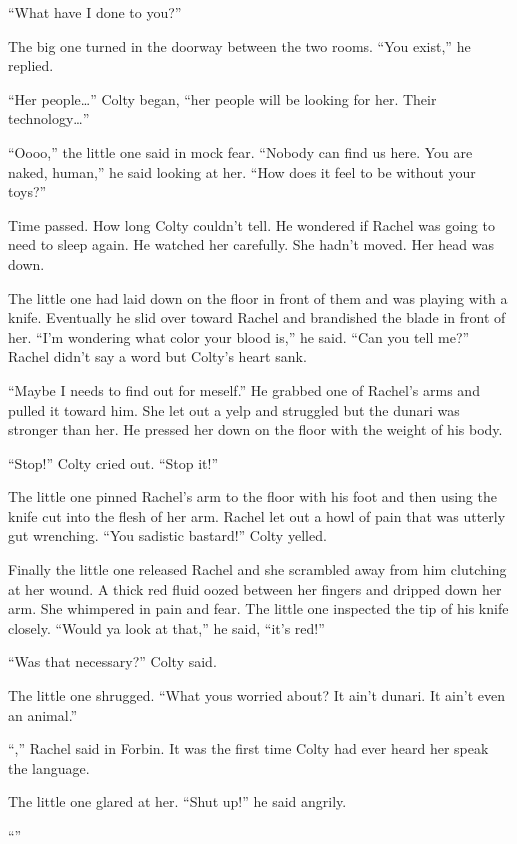 ``What have I done to you?''

The big one turned in the doorway between the two rooms. ``You exist,'' he replied.

``Her people\ldots'' Colty began, ``her people will be looking for her. Their technology\ldots''

``Oooo,'' the little one said in mock fear. ``Nobody can find us here. You are naked, human,''
he said looking at her. ``How does it feel to be without your toys?''

Time passed. How long Colty couldn't tell. He wondered if Rachel was going to need to sleep
again. He watched her carefully. She hadn't moved. Her head was down.

The little one had laid down on the floor in front of them and was playing with a knife.
Eventually he slid over toward Rachel and brandished the blade in front of her. ``I'm wondering
what color your blood is,'' he said. ``Can you tell me?'' Rachel didn't say a word but Colty's
heart sank.

``Maybe I needs to find out for meself.'' He grabbed one of Rachel's arms and pulled it toward
him. She let out a yelp and struggled but the dunari was stronger than her. He pressed her down
on the floor with the weight of his body.

``Stop!'' Colty cried out. ``Stop it!''

The little one pinned Rachel's arm to the floor with his foot and then using the knife cut into
the flesh of her arm. Rachel let out a howl of pain that was utterly gut wrenching. ``You
sadistic bastard!'' Colty yelled.

Finally the little one released Rachel and she scrambled away from him clutching at her wound. A
thick red fluid oozed between her fingers and dripped down her arm. She whimpered in pain and
fear. The little one inspected the tip of his knife closely. ``Would ya look at that,'' he said,
``it's red!''

``Was that necessary?'' Colty said.

The little one shrugged. ``What yous worried about? It ain't dunari. It ain't even an animal.''

``,'' Rachel said in Forbin. It was the first time Colty
had ever heard her speak the language.

The little one glared at her. ``Shut up!'' he said angrily.

``''

